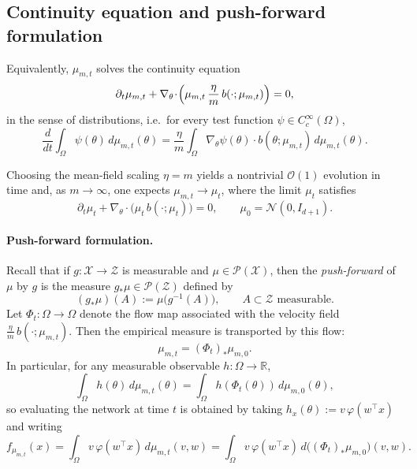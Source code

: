 \subsection{\label{app:mf-continuity-equation}Continuity equation and push-forward formulation}

Equivalently, $\mu_{m,t}$ solves the continuity equation
\begin{equation}
	\partial_t\mu_{m,t}
	+
	\nabla_\theta\!\cdot\!\Bigl(\mu_{m,t}\,\frac{\eta}{m}\,b(\cdot;\mu_{m,t})\Bigr)
	=
	0,
	\label{eq:mf-continuity-compact-app}
\end{equation}
in the sense of distributions, i.e.\ for every test function
$\psi\in C_c^\infty(\Omega)$,
\[
	\frac{d}{dt}\int_\Omega \psi(\theta)\,d\mu_{m,t}(\theta)
	=
	\frac{\eta}{m}\int_\Omega \nabla_\theta\psi(\theta)\cdot b(\theta;\mu_{m,t})\,d\mu_{m,t}(\theta).
\]

Choosing the mean-field scaling $\eta=m$ yields a nontrivial $\mathcal O(1)$
evolution in time and, as $m\to\infty$, one expects $\mu_{m,t} \to \mu_t$,
where the limit $\mu_t$ satisfies
\begin{equation}
	\partial_t\mu_t+\nabla_\theta\!\cdot\bigl(\mu_t\,b(\cdot;\mu_t)\bigr)=0,
	\qquad \mu_0=\mathcal N (0,I_{d+1}).
	\label{eq:mf-continuity-with-initial-conditions-app}
\end{equation}

\paragraph{Push-forward formulation.}
Recall that if $g:\mathcal X\to\mathcal Z$ is measurable and $\mu\in\mathcal P(\mathcal X)$, then the
\emph{push-forward} of $\mu$ by $g$ is the measure $g_*\mu\in\mathcal P(\mathcal Z)$ defined by
\[
	(g_*\mu)(A):=\mu\bigl(g^{-1}(A)\bigr),
	\qquad A\subset\mathcal Z \text{ measurable}.
\]
Let $\Phi_t:\Omega\to\Omega$ denote the flow map associated with the velocity field
$\frac{\eta}{m}\,b(\cdot;\mu_{m,t})$. Then the empirical measure is transported by this flow:
\[
	\mu_{m,t} = (\Phi_t)_*\mu_{m,0}.
\]
In particular, for any measurable observable $h:\Omega\to\mathbb R$,
\[
	\int_\Omega h(\theta)\,d\mu_{m,t}(\theta)
	=
	\int_\Omega h\!\left(\Phi_t(\theta)\right)\,d\mu_{m,0}(\theta),
\]
so evaluating the network at time $t$ is obtained by taking
$h_x(\theta):=v\,\varphi(w^\top x)$ and writing
\[
	f_{\mu_{m,t}}(x)
	=
	\int_\Omega v\,\varphi(w^\top x)\,d\mu_{m,t}(v,w)
	=
	\int_\Omega v\,\varphi(w^\top x)\,d\bigl((\Phi_t)_*\mu_{m,0}\bigr)(v,w).
\]


